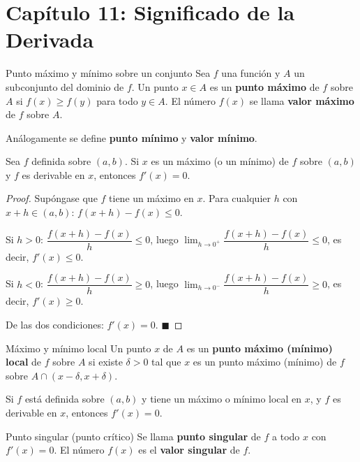 \documentclass[12pt]{article}
\begin{document}
\section{Capítulo 11: Significado de la Derivada}

\begin{definicion}[]{Punto máximo y mínimo sobre un conjunto}
Sea $f$ una función y $A$ un subconjunto del dominio de $f$. Un punto $x \in A$ es un \textbf{punto máximo} de $f$ sobre $A$ si $f(x) \geq f(y)$ para todo $y \in A$. El número $f(x)$ se llama \textbf{valor máximo} de $f$ sobre $A$.

Análogamente se define \textbf{punto mínimo} y \textbf{valor mínimo}.
\end{definicion}

\begin{teorema}[1]{}
Sea $f$ definida sobre $(a, b)$. Si $x$ es un máximo (o un mínimo) de $f$ sobre $(a, b)$ y $f$ es derivable en $x$, entonces $f'(x) = 0$.
\end{teorema}

\begin{proof}
Supóngase que $f$ tiene un máximo en $x$. Para cualquier $h$ con $x+h \in (a,b)$: $f(x+h)-f(x) \leq 0$.

Si $h > 0$: $\dfrac{f(x+h)-f(x)}{h} \leq 0$, luego $\displaystyle\lim_{h\to 0^+}\dfrac{f(x+h)-f(x)}{h} \leq 0$, es decir, $f'(x) \leq 0$.

Si $h < 0$: $\dfrac{f(x+h)-f(x)}{h} \geq 0$, luego $\displaystyle\lim_{h\to 0^-}\dfrac{f(x+h)-f(x)}{h} \geq 0$, es decir, $f'(x) \geq 0$.

De las dos condiciones: $f'(x) = 0$.
$\blacksquare$
\end{proof}

\begin{definicion}[]{Máximo y mínimo local}
Un punto $x$ de $A$ es un \textbf{punto máximo (mínimo) local} de $f$ sobre $A$ si existe $\delta > 0$ tal que $x$ es un punto máximo (mínimo) de $f$ sobre $A \cap (x-\delta, x+\delta)$.
\end{definicion}

\begin{teorema}[2]{}
Si $f$ está definida sobre $(a, b)$ y tiene un máximo o mínimo local en $x$, y $f$ es derivable en $x$, entonces $f'(x) = 0$.
\end{teorema}

\begin{definicion}[]{Punto singular (punto crítico)}
Se llama \textbf{punto singular} de $f$ a todo $x$ con $f'(x) = 0$. El número $f(x)$ es el \textbf{valor singular} de $f$.
\end{definicion}
\end{document}
